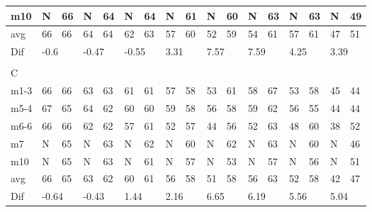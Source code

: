 \begin{table}[H]
\begin{tabular}{l|l|l|l|l|l|l|l|l|l|l|l|l|l|l|l|l}
m10  &   N  &     66    &   N    &   64    &     N      &     64      &    N     &     61       &    N     &       60     &      N     &       63     &        N   &       63     & N & 49 \\ \hline
avg       &      66 &   66     &      64    &  64     &    62         &     63       &      57      &   60    &     52       &    59        &    54        &      61      &      57      &     61       & 47 &51 \\ \hline
Dif & \multicolumn{2}{l|}{-0.6} & \multicolumn{2}{l|}{-0.47} & \multicolumn{2}{l|}{-0.55} & \multicolumn{2}{l|}{3.31} & \multicolumn{2}{l|}{7.57} & \multicolumn{2}{l|}{7.59}& \multicolumn{2}{l|}{4.25}& \multicolumn{2}{l}{3.39} \\
\multicolumn{17}{l}{ } \\   
C & \multicolumn{2}{l|}{} & \multicolumn{2}{l|}{} & \multicolumn{2}{l|}{} & \multicolumn{2}{l|}{} & \multicolumn{2}{l|}{} & \multicolumn{2}{l|}{}& \multicolumn{2}{l|}{}& \multicolumn{2}{l}{}     \\ \hline
m1-3   &   66  &      66      &    63  &   63         &   61   &     61       &  57   &      58      &  53   &  61   &  58   &      67      &   53   &      58      & 45 &44  \\
m5-4   &    67  &      65      &   64  &     62       &   60    &     60       &  59  &      58      &  56  &  58   &   59  &        62    &   56  &      55      & 44 &44  \\
m6-6   &    66   &     66       &  62  &     62       &    57   &      61      &  52   &       57     &   44  & 56   &   52   &      63      &   48 &       60     & 38 & 52 \\
m7   &   N    &     65       &  N  &    63        & N   &      62      &  N   &      60      & N & 62   &   N   &      63      &   N   &    60        & N & 46 \\
m10  &  N   &      65      &   N  &    63        &  N  &      61      &   N  &       57    &  N  &  53 &  N   &     57       &   N  &      56      & N &  51\\ \hline
avg      &   66    &      65      &     63   &     62      &      60&   61      &       56  &     58       &   51   &  58     &  56     &   63         &      52      &    58        & 42 &47 \\ \hline
Dif & \multicolumn{2}{l|}{-0.64} & \multicolumn{2}{l|}{-0.43} & \multicolumn{2}{l|}{1.44} & \multicolumn{2}{l|}{2.16} & \multicolumn{2}{l|}{6.65} & \multicolumn{2}{l|}{6.19}& \multicolumn{2}{l|}{5.56}& \multicolumn{2}{l}{5.04} \\

\end{tabular}
\end{table}
